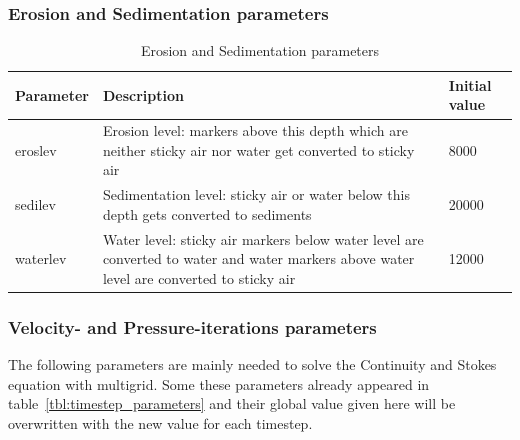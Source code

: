 \subsubsection{Erosion and Sedimentation parameters}

\begin{table}[H]
	\small
	\centering
	\begin{tabular}{l p{10cm} l}
		\toprule
		Parameter & Description & Initial value \\
		\midrule
		eroslev 	& Erosion level: markers above this depth which are neither sticky air nor water get converted to sticky air & 8000\\
		sedilev 	& Sedimentation level: sticky air or water below this depth gets converted to sediments & 20000\\
		waterlev 	& Water level: sticky air markers below water level are converted to water and water markers above water level are converted to sticky air & 12000\\
		\bottomrule
	\end{tabular}
	\caption{Erosion and Sedimentation parameters}
	\label{tbl:mode_sed_parameters}
\end{table}

\subsubsection{Velocity- and Pressure-iterations parameters}
The following parameters are mainly needed to solve the Continuity and Stokes equation with multigrid. Some these parameters already appeared in table~\ref{tbl:timestep_parameters} and their global value given here will be overwritten with the new value for each timestep. 

